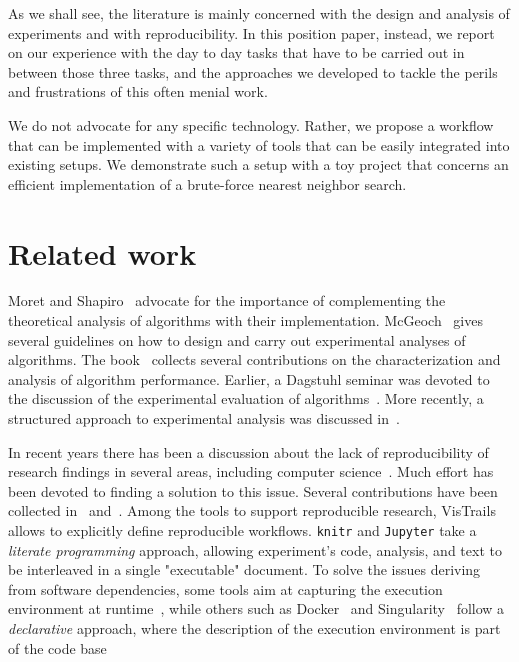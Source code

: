 \documentclass{llncs}
\begin{document}
As we shall see, the literature is mainly concerned with the design 
and analysis of
experiments
and with reproducibility.
In this position paper, instead, we report on our experience with the day to day
tasks that have to be carried out in between those three tasks, and
the approaches we developed to tackle the perils and frustrations of this 
often menial work. 

We do not advocate for any specific technology. Rather, we propose a workflow
that can be implemented with a variety of tools that can be easily integrated
into existing setups. We demonstrate such a setup with a toy project that concerns an efficient implementation of a brute-force nearest neighbor search.

\section{Related work}

Moret and Shapiro~\cite{DBLP:journals/jucs/MoretS01} advocate for the
importance of complementing the theoretical analysis of algorithms
with their implementation.
McGeoch~\cite{DBLP:reference/algo/McGeoch08} gives several guidelines on how to
design and carry out experimental analyses of algorithms.
The book~\cite{DBLP:books/sp/2010BCPP} collects several contributions
on the characterization and analysis of algorithm performance.
Earlier, a Dagstuhl seminar was devoted to the discussion of the
experimental evaluation of algorithms~\cite{DBLP:conf/dagstuhl/2000ea}.
More recently, a structured approach to 
experimental analysis was discussed in~\cite{DBLP:series/ncs/Bartz-BeielsteinP14}.
%

In recent years there has been a discussion about the lack of reproducibility
of research findings in several areas, including 
computer science~\cite{DBLP:journals/cacm/CollbergP16,Hutson725}.
Much effort has been devoted to finding a solution to this issue. Several
contributions have been collected in~\cite{stodden2014implementing} 
and~\cite{kitzes2017practice}.
Among the tools to support reproducible research, 
VisTrails~\cite{DBLP:conf/sigmod/CallahanFSSSV06} allows to
explicitly define reproducible workflows.
\texttt{knitr} and \texttt{Jupyter} take a \emph{literate programming}
approach, allowing experiment's code, analysis, and text to be interleaved
in a single "executable" document.
To solve the issues deriving from software dependencies,
some tools aim at capturing the execution
environment at runtime~\cite{DBLP:journals/cse/Guo12,davison2014sumatra,DBLP:journals/jossw/RampinCSFS16},
while others such as Docker~\cite{DBLP:journals/sigops/Boettiger15}
and Singularity~\cite{kurtzer2017singularity} follow a \emph{declarative}
approach, where the description of the execution environment is part
of the code base
\end{document}
